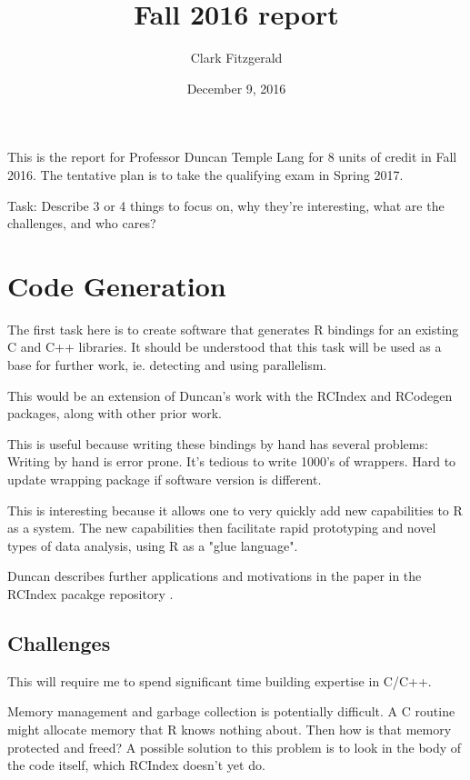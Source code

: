 \documentclass[12pt]{article}
\begin{document}
\title{Fall 2016 report}
\date{December 9, 2016}
\author{Clark Fitzgerald}
\maketitle

This is the report for Professor Duncan Temple Lang for 8 units of
credit in Fall 2016.  The tentative plan is to take the qualifying exam in
Spring 2017.

\begin{textbf}
    Task: Describe 3 or 4 things to focus on, why they're interesting, what are the
challenges, and who cares?
\end{textbf}


\section{Code Generation}

The first task here is to create software that generates R bindings for an
existing C and C++ libraries. 
It should be understood that this task will be used as a base for
further work, ie. detecting and using parallelism.

This would be an extension of Duncan's work with the RCIndex \cite{R-RCIndex} and
RCodegen \cite{R-RCodegen} packages, along with other prior work.

This is useful because writing these bindings by hand
has several problems: 
Writing by hand is error prone.
It's tedious to write 1000's of wrappers.
Hard to update wrapping package if software version is different.

This is interesting because it allows one to very quickly add new
capabilities to R as a system. The new capabilities then facilitate rapid
prototyping and novel types of data analysis, using R as a "glue language".

Duncan describes further applications and motivations in the paper in
the RCIndex pacakge repository \cite{R-RCIndex}.

\subsection{Challenges}

This will require me to spend significant time building expertise in C/C++.

Memory management and garbage collection is potentially difficult. A C routine might allocate
memory that R knows nothing about. Then how is that memory protected and freed? A
possible solution to this problem is to look in the body of the code
itself, which RCIndex doesn't yet do.
\end{document}
